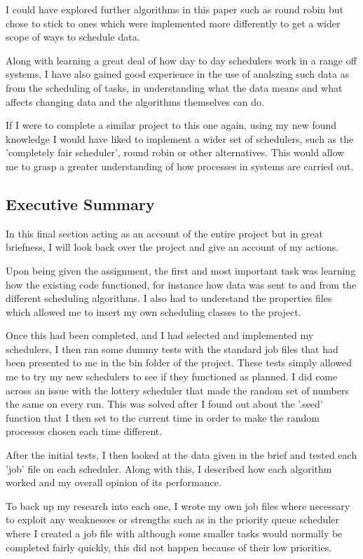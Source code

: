 \documentclass{sig-alternate}
\begin{document}
I could have explored further algorithms in this paper such as round robin but
chose to stick to ones which were implemented more differently to get a wider
scope of ways to schedule data.

Along with learning a great deal of how day to day schedulers work in a range
off systems, I have also gained good experience in the use of analszing such
data as from the scheduling of tasks, in understanding what the data means and
what affects changing data and the algorithms themselves can do. 

If I were to complete a similar project to this one again, using my new found
knowledge I would have liked to implement a wider set of schedulers, such as
the 'completely fair scheduler', round robin or other alternatives. This would
allow me to grasp a greater understanding of how processes in systems are
carried out.

\subsection{Executive Summary}
In this final section acting as an account of the entire project but in great
briefness, I will look back over the project and give an account of my actions.

Upon being given the assignment, the first and most important task was learning 
how the existing code functioned, for instance how data was sent to and from the
different scheduling algorithms. I also had to understand the properties files
which allowed me to insert my own scheduling classes to the project.

Once this had been completed, and I had selected and implemented my schedulers,
I then ran some dummy tests with the standard job files that had been presented
to me in the bin folder of the project. These tests simply allowed me to try my
new schedulers to see if they functioned as planned. I did come across an issue
with the lottery scheduler that made the random set of numbers the same on every
run. This was solved after I found out about the '.seed' function that I then
set to the current time in order to make the random processes chosen each time
different.

After the initial tests, I then looked at the data given in the brief and
tested each 'job' file on each scheduler. Along with this, I described how each
algorithm worked and my overall opinion of its performance. 

To back up my research into each one, I wrote my own job files where necessary
to exploit any weaknesses or strengths such as in the priority queue scheduler
where I created a job file with although some smaller tasks would normally be
completed fairly quickly, this did not happen because of their low priorities. 
\end{document}
